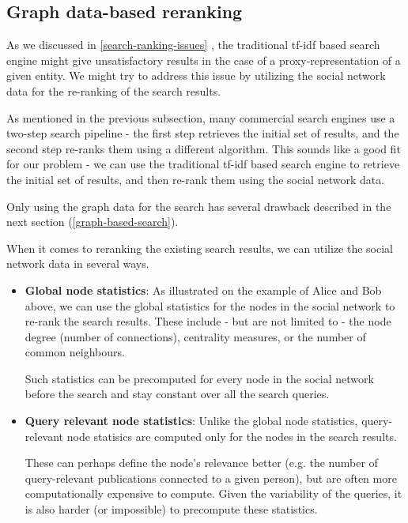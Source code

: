 \subsection{Graph data-based reranking}

As we discussed in \ref{search-ranking-issues}
, the traditional tf-idf based search engine might give unsatisfactory results in the case 
of a proxy-representation of a given entity.
We might try to address this issue by utilizing the social network data for the re-ranking of the search results.

As mentioned in the previous subsection, many commercial search engines use a two-step search pipeline - the first step retrieves the initial set of results,
and the second step re-ranks them using a different algorithm. This sounds like a good fit for our problem - we can use the traditional tf-idf based search engine 
to retrieve the initial set of results, and then re-rank them using the social network data. 

Only using the graph data for the search has several drawback described in the next section (\ref{graph-based-search}).

When it comes to reranking the existing search results, we can utilize the social network data in several ways.

\begin{itemize}
    \item \textbf{Global node statistics}: As illustrated on the example of Alice and Bob above, 
    we can use the global statistics for the nodes in the social network to re-rank the search results. 
    These include - but are not limited to - the node degree (number of connections), centrality measures, or the number of common neighbours.

    Such statistics can be precomputed for every node in the social network before the search and stay constant over all the search queries.

    \item \textbf{Query relevant node statistics}: Unlike the global node statistics, query-relevant node statisics are computed only for the nodes in the search results.
    
    These can perhaps define the node's relevance better (e.g. the number of query-relevant publications connected to a given person), but are often more computationally expensive to compute.
    Given the variability of the queries, it is also harder (or impossible) to precompute these statistics.
\end{itemize}

